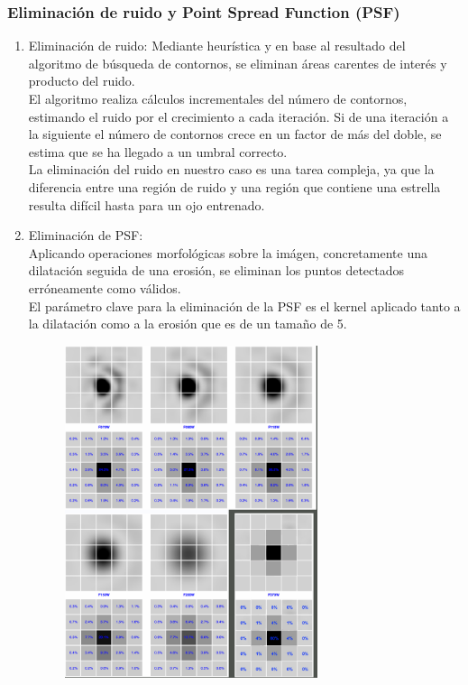 	\subsubsection{Eliminación de ruido y Point Spread Function (PSF)}
	\begin{enumerate}
	\item Eliminación de ruido:
	Mediante heurística y en base al resultado del algoritmo de búsqueda de contornos, se eliminan áreas carentes de interés y producto del ruido.
	\\El algoritmo realiza cálculos incrementales del número de contornos, estimando el ruido por el crecimiento a cada iteración. Si de una iteración a la siguiente el número de contornos crece en un factor de más del doble, se estima que se ha llegado a un umbral correcto.
	\\
	La eliminación del ruido en nuestro caso es una tarea compleja, ya que la diferencia entre una región de ruido y una región que contiene una estrella resulta difícil hasta para un ojo entrenado.
	\newline
	\item Eliminación de PSF:\\
    Aplicando operaciones morfológicas sobre la imágen, concretamente una dilatación seguida de una erosión, se eliminan los puntos detectados erróneamente como válidos.
    \\
    El parámetro clave para la eliminación de la PSF es el kernel aplicado tanto a la dilatación como a la erosión que es de un tamaño de 5.
    	\begin{figure}[!htb]
    		\centering
    		\includegraphics[width=0.7\textwidth]{images/PSFUnificadas.png}

\end{figure}
\end{enumerate}
